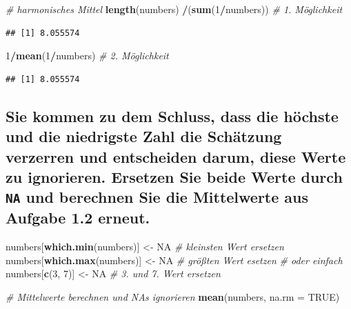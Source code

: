 \documentclass[12pt,a4paper]{article}
\newenvironment{Shaded}{\begin{snugshade}}{\end{snugshade}}
\newcommand{\AttributeTok}[1]{\textcolor[rgb]{0.13,0.29,0.53}{#1}}
\newcommand{\CommentTok}[1]{\textcolor[rgb]{0.56,0.35,0.01}{\textit{#1}}}
\newcommand{\ConstantTok}[1]{\textcolor[rgb]{0.56,0.35,0.01}{#1}}
\newcommand{\DecValTok}[1]{\textcolor[rgb]{0.00,0.00,0.81}{#1}}
\newcommand{\FunctionTok}[1]{\textcolor[rgb]{0.13,0.29,0.53}{\textbf{#1}}}
\newcommand{\NormalTok}[1]{#1}
\newcommand{\OtherTok}[1]{\textcolor[rgb]{0.56,0.35,0.01}{#1}}
\newcommand{\SpecialCharTok}[1]{\textcolor[rgb]{0.81,0.36,0.00}{\textbf{#1}}}
\begin{document}
\begin{Shaded}
\begin{Highlighting}[]
    \CommentTok{\# harmonisches Mittel}
    \FunctionTok{length}\NormalTok{(numbers) }\SpecialCharTok{/}\NormalTok{(}\FunctionTok{sum}\NormalTok{(}\DecValTok{1}\SpecialCharTok{/}\NormalTok{numbers))       }\CommentTok{\# 1. Möglichkeit}
\end{Highlighting}
\end{Shaded}

\begin{verbatim}
## [1] 8.055574
\end{verbatim}

\begin{Shaded}
\begin{Highlighting}[]
    \DecValTok{1}\SpecialCharTok{/}\FunctionTok{mean}\NormalTok{(}\DecValTok{1}\SpecialCharTok{/}\NormalTok{numbers)                       }\CommentTok{\# 2. Möglichkeit}
\end{Highlighting}
\end{Shaded}

\begin{verbatim}
## [1] 8.055574
\end{verbatim}

\vspace{0.5cm}

\subsection{\texorpdfstring{Sie kommen zu dem Schluss, dass die höchste
und die niedrigste Zahl die Schätzung verzerren und entscheiden darum,
diese Werte zu ignorieren. Ersetzen Sie beide Werte durch \texttt{NA}
und berechnen Sie die Mittelwerte aus Aufgabe 1.2
erneut.}{Sie kommen zu dem Schluss, dass die höchste und die niedrigste Zahl die Schätzung verzerren und entscheiden darum, diese Werte zu ignorieren. Ersetzen Sie beide Werte durch  und berechnen Sie die Mittelwerte aus Aufgabe 1.2 erneut.}}\label{sie-kommen-zu-dem-schluss-dass-die-huxf6chste-und-die-niedrigste-zahl-die-schuxe4tzung-verzerren-und-entscheiden-darum-diese-werte-zu-ignorieren.-ersetzen-sie-beide-werte-durch-und-berechnen-sie-die-mittelwerte-aus-aufgabe-1.2-erneut.}

\begin{Shaded}
\begin{Highlighting}[]
\NormalTok{    numbers[}\FunctionTok{which.min}\NormalTok{(numbers)] }\OtherTok{\textless{}{-}} \ConstantTok{NA}     \CommentTok{\# kleinsten Wert ersetzen}
\NormalTok{    numbers[}\FunctionTok{which.max}\NormalTok{(numbers)] }\OtherTok{\textless{}{-}} \ConstantTok{NA}     \CommentTok{\# größten Wert esetzen }
    \CommentTok{\# oder einfach }
\NormalTok{    numbers[}\FunctionTok{c}\NormalTok{(}\DecValTok{3}\NormalTok{, }\DecValTok{7}\NormalTok{)] }\OtherTok{\textless{}{-}} \ConstantTok{NA}                \CommentTok{\# 3. und 7. Wert ersetzen }
    
    \CommentTok{\# Mittelwerte berechnen und \textquotesingle{}NA\textquotesingle{}s ignorieren}
    \FunctionTok{mean}\NormalTok{(numbers, }\AttributeTok{na.rm =} \ConstantTok{TRUE}\NormalTok{)}
\end{Highlighting}
\end{Shaded}
\end{document}
